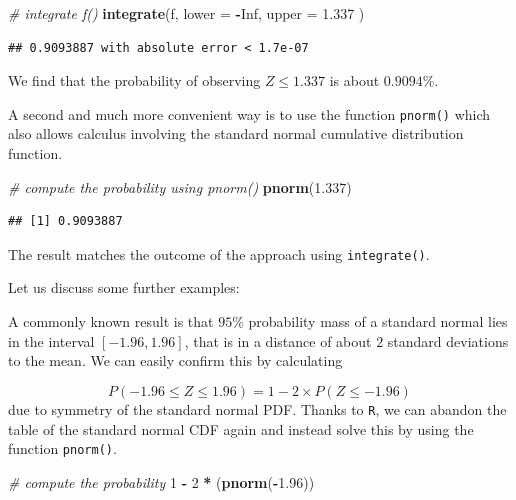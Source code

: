 \documentclass[]{book}
\newenvironment{Shaded}{\begin{snugshade}}{\end{snugshade}}
\newcommand{\KeywordTok}[1]{\textcolor[rgb]{0.13,0.29,0.53}{\textbf{#1}}}
\newcommand{\DataTypeTok}[1]{\textcolor[rgb]{0.13,0.29,0.53}{#1}}
\newcommand{\DecValTok}[1]{\textcolor[rgb]{0.00,0.00,0.81}{#1}}
\newcommand{\FloatTok}[1]{\textcolor[rgb]{0.00,0.00,0.81}{#1}}
\newcommand{\StringTok}[1]{\textcolor[rgb]{0.31,0.60,0.02}{#1}}
\newcommand{\CommentTok}[1]{\textcolor[rgb]{0.56,0.35,0.01}{\textit{#1}}}
\newcommand{\OtherTok}[1]{\textcolor[rgb]{0.56,0.35,0.01}{#1}}
\newcommand{\OperatorTok}[1]{\textcolor[rgb]{0.81,0.36,0.00}{\textbf{#1}}}
\newcommand{\NormalTok}[1]{#1}
\theoremstyle{definition}
\theoremstyle{definition}
\theoremstyle{definition}
\theoremstyle{remark}
\begin{document}
\begin{Shaded}
\begin{Highlighting}[]
\CommentTok{# integrate f()}
\KeywordTok{integrate}\NormalTok{(f, }
          \DataTypeTok{lower =} \OperatorTok{-}\OtherTok{Inf}\NormalTok{, }
          \DataTypeTok{upper =} \FloatTok{1.337}
\NormalTok{          )}
\end{Highlighting}
\end{Shaded}

\begin{verbatim}
## 0.9093887 with absolute error < 1.7e-07
\end{verbatim}

We find that the probability of observing \(Z \leq 1.337\) is about
\(0.9094\%\).

A second and much more convenient way is to use the function
\texttt{pnorm()} which also allows calculus involving the standard
normal cumulative distribution function.

\begin{Shaded}
\begin{Highlighting}[]
\CommentTok{# compute the probability using pnorm()}
\KeywordTok{pnorm}\NormalTok{(}\FloatTok{1.337}\NormalTok{)}
\end{Highlighting}
\end{Shaded}

\begin{verbatim}
## [1] 0.9093887
\end{verbatim}

The result matches the outcome of the approach using
\texttt{integrate()}.

Let us discuss some further examples:

A commonly known result is that \(95\%\) probability mass of a standard
normal lies in the interval \([-1.96, 1.96]\), that is in a distance of
about \(2\) standard deviations to the mean. We can easily confirm this
by calculating

\[ P(-1.96 \leq Z \leq 1.96) = 1-2\times P(Z \leq -1.96) \] due to
symmetry of the standard normal PDF. Thanks to \texttt{R}, we can
abandon the table of the standard normal CDF again and instead solve
this by using the function \texttt{pnorm()}.

\begin{Shaded}
\begin{Highlighting}[]
\CommentTok{# compute the probability}
\DecValTok{1} \OperatorTok{-}\StringTok{ }\DecValTok{2} \OperatorTok{*}\StringTok{ }\NormalTok{(}\KeywordTok{pnorm}\NormalTok{(}\OperatorTok{-}\FloatTok{1.96}\NormalTok{)) }
\end{Highlighting}
\end{Shaded}
\end{document}
